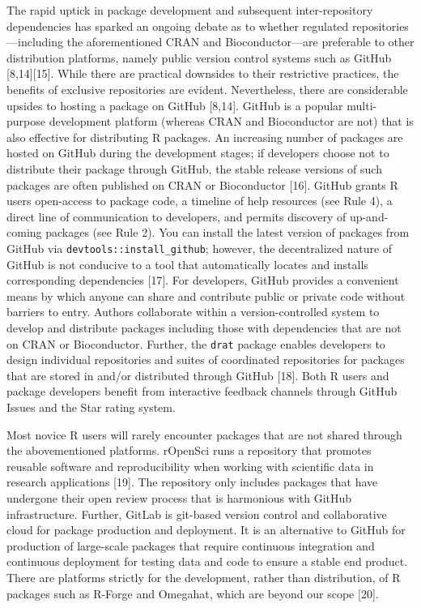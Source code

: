 \documentclass[10pt,letterpaper]{article}
\begin{document}
The rapid uptick in package development and subsequent inter-repository
dependencies has sparked an ongoing debate as to whether regulated
repositories---including the aforementioned CRAN and Bioconductor---are
preferable to other distribution platforms, namely public version
control systems such as GitHub {[}8,14{]}{[}15{]}. While there are
practical downsides to their restrictive practices, the benefits of
exclusive repositories are evident. Nevertheless, there are considerable
upsides to hosting a package on GitHub {[}8,14{]}. GitHub is a popular
multi-purpose development platform (whereas CRAN and Bioconductor are
not) that is also effective for distributing R packages. An increasing
number of packages are hosted on GitHub during the development stages;
if developers choose not to distribute their package through GitHub, the
stable release versions of such packages are often published on CRAN or
Bioconductor {[}16{]}. GitHub grants R users open-access to package
code, a timeline of help resources (see Rule 4), a direct line of
communication to developers, and permits discovery of up-and-coming
packages (see Rule 2). You can install the latest version of packages
from GitHub via \texttt{devtools::install\_github}; however, the
decentralized nature of GitHub is not conducive to a tool that
automatically locates and installs corresponding dependencies {[}17{]}.
For developers, GitHub provides a convenient means by which anyone can
share and contribute public or private code without barriers to entry.
Authors collaborate within a version-controlled system to develop and
distribute packages including those with dependencies that are not on
CRAN or Bioconductor. Further, the \texttt{drat} package enables
developers to design individual repositories and suites of coordinated
repositories for packages that are stored in and/or distributed through
GitHub {[}18{]}. Both R users and package developers benefit from
interactive feedback channels through GitHub Issues and the Star rating
system.

Most novice R users will rarely encounter packages that are not shared
through the abovementioned platforms. rOpenSci runs a repository that
promotes reusable software and reproducibility when working with
scientific data in research applications {[}19{]}. The repository only
includes packages that have undergone their open review process that is
harmonious with GitHub infrastructure. Further, GitLab is git-based
version control and collaborative cloud for package production and
deployment. It is an alternative to GitHub for production of large-scale
packages that require continuous integration and continuous deployment
for testing data and code to ensure a stable end product. There are
platforms strictly for the development, rather than distribution, of R
packages such as R-Forge and Omegahat, which are beyond our scope
{[}20{]}.
\end{document}
